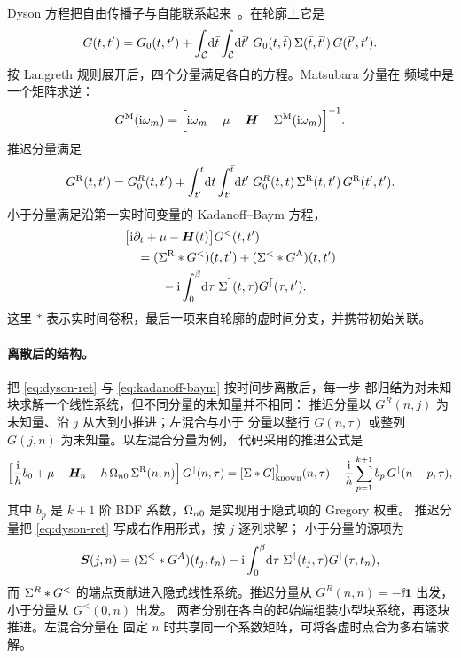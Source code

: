 Dyson 方程把自由传播子与自能联系起来~\cite{stefanucci2013}。在轮廓上它是
\begin{equation}
    G(t,t') = G_0(t,t')
    + \int_{\mathcal{C}}\!\mathrm{d}\bar t\int_{\mathcal{C}}\!\mathrm{d}\bar t'\;
      G_0(t,\bar t)\,\Sigma(\bar t,\bar t')\,G(\bar t',t').
    \label{eq:dyson-contour}
\end{equation}
按 Langreth 规则展开后，四个分量满足各自的方程。Matsubara 分量在
频域中是一个矩阵求逆：
\begin{equation}
    G^{\mathrm{M}}(\mathrm{i}\omega_m)
    =
    \Big[\mathrm{i}\omega_m + \mu - \bm{H} - \Sigma^{\mathrm{M}}(\mathrm{i}\omega_m)\Big]^{-1}.
    \label{eq:dyson-mat}
\end{equation}
推迟分量满足
\begin{equation}
    G^{\mathrm{R}}(t,t') = G_0^{R}(t,t')
    + \int_{t'}^{t}\!\mathrm{d}\bar t\int_{t'}^{\bar t}\!\mathrm{d}\bar t'\;
      G_0^{R}(t,\bar t)\,\Sigma^{\mathrm{R}}(\bar t,\bar t')\,G^{\mathrm{R}}(\bar t',t').
    \label{eq:dyson-ret}
\end{equation}
小于分量满足沿第一实时间变量的 Kadanoff--Baym 方程，
\begin{equation}
\begin{aligned}
    &\big[\mathrm{i}\partial_t +\mu-\bm{H}(t)\big]G^{<}(t,t')\\
    &\quad= (\Sigma^{\mathrm{R}} * G^{<})(t,t') + (\Sigma^{<} * G^{\mathrm{A}})(t,t')\\
    &\qquad\quad -\mathrm{i}\int_0^\beta\!\mathrm{d}\tau\;
       \Sigma^{\rceil}(t,\tau)G^{\lceil}(\tau,t').
\end{aligned}
\label{eq:kadanoff-baym}
\end{equation}
这里 $*$ 表示实时间卷积，最后一项来自轮廓的虚时间分支，并携带初始关联。

\paragraph{离散后的结构。}
把 \cref{eq:dyson-ret} 与 \cref{eq:kadanoff-baym} 按时间步离散后，每一步
都归结为对未知块求解一个线性系统，但不同分量的未知量并不相同：
推迟分量以 $G^{R}(n,j)$ 为未知量、沿 $j$ 从大到小推进；左混合与小于
分量以整行 $G(n,\tau)$ 或整列 $G(j,n)$ 为未知量。以左混合分量为例，
代码采用的推进公式是
\begin{equation}
    \Big[\frac{\mathrm{i}}{h}b_0 + \mu - \bm{H}_n
      - h\,\Omega_{n0}\,\Sigma^{\mathrm{R}}(n,n)\Big]\,
      G^{\rceil}(n,\tau)
    =
    [\Sigma*G]^{\rceil}_{\text{known}}(n,\tau)
    -
    \frac{\mathrm{i}}{h}\sum^{k+1}_{p=1} b_p\,
      G^{\rceil}(n-p,\tau),
    \label{eq:discrete-lmix}
\end{equation}
其中 $b_p$ 是 $k+1$ 阶 BDF 系数，$\Omega_{n0}$ 是实现用于隐式项的 Gregory 权重。
推迟分量把 \cref{eq:dyson-ret} 写成右作用形式，按 $j$ 逐列求解；
小于分量的源项为
\begin{equation}
    \bm{S}(j,n) = (\Sigma^{<}*G^{A})(t_j,t_n)
      -\mathrm{i}\int_0^\beta\!\mathrm{d}\tau\;\Sigma^{\rceil}(t_j,\tau)G^{\lceil}(\tau,t_n),
    \label{eq:less-source}
\end{equation}
而 $\Sigma^{R}*G^{<}$ 的端点贡献进入隐式线性系统。推迟分量从
$G^R(n,n)=-\ii\bm{1}$ 出发，小于分量从 $G^<(0,n)$ 出发。
两者分别在各自的起始端组装小型块系统，再逐块推进。左混合分量在
固定 $n$ 时共享同一个系数矩阵，可将各虚时点合为多右端求解。

